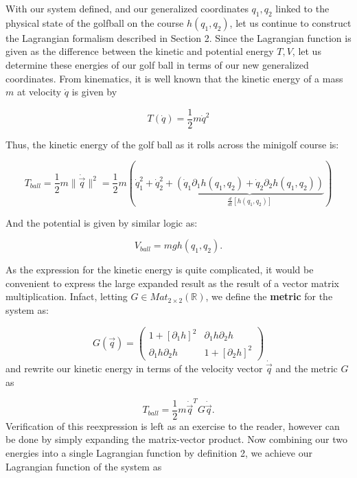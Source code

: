 With our system defined, and our generalized coordinates $q_1, q_2$ linked to the physical state of the golfball on the course $h(q_1,q_2)$, let us continue to construct the Lagrangian formalism described in Section 2. Since the Lagrangian function is given as the difference between the kinetic and potential energy $T,V$, let us determine these energies of our golf ball in terms of our new generalized coordinates. From kinematics, it is well known that the kinetic energy of a mass $m$ at velocity $\dot q$ is given by

\begin{equation}
	T(\dot q) = \frac{1}{2}m\dot q^2
\end{equation}

Thus, the kinetic energy of the golf ball as it rolls across the minigolf course is:

\begin{equation}
	T_{ball}=\frac{1}{2}m\|\dot{\vec q}\|^2 = \frac{1}{2}m(\dot q_1^2 + \dot q_2^2 + \underbrace{\left(\dot q_1\partial_1h(q_1,q_2) +\dot q_2 \partial_2 h(q_1,q_2)\right)}_{\frac{d}{dt}\left[h(q_1, q_2)\right]})
\end{equation}

And the potential is given by similar logic as:

\begin{equation}
	V_{ball}=mgh(q_1,q_2).
\end{equation}

As the expression for the kinetic energy is quite complicated, it would be convenient to express the large expanded result as the result of a vector matrix multiplication. Infact, letting $G\in Mat_{2\times2}(\mathbb{R})$, we define the \textbf{metric} for the system as:

\begin{equation}
	G(\vec q) = \begin{pmatrix}
		1+[\partial_1 h]^2 & \partial_1 h \partial_2 h \\ \partial_1 h \partial_2 h & 1 +[\partial_2 h]^2
	\end{pmatrix}
\end{equation}
and rewrite our kinetic energy in terms of the velocity vector $\dot{\vec q}$ and the metric $G$ as

\begin{equation}
	T_{ball}=\frac{1}{2}m\dot{\vec q}^T G \dot{\vec q}.
\end{equation}
Verification of this reexpression is left as an exercise to the reader, however can be done by simply expanding the matrix-vector product. Now combining our two energies into a single Lagrangian function by definition 2, we achieve our Lagrangian function of the system as

